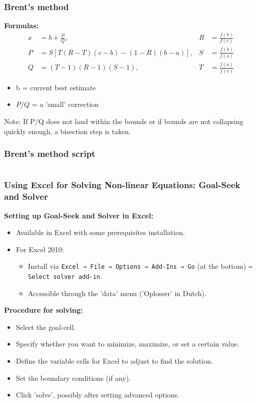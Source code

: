 \begin{frame}[fragile]
  \frametitle{Brent's method}
  \textbf{Formulas:}
  \begin{align*}
    x &= b + \frac{P}{Q}, & R &= \frac{f(b)}{f(c)} \\
    P &= S\left[T(R-T)(c-b) - (1-R)(b-a)\right], & S &= \frac{f(b)}{f(a)} \\
    Q &= (T-1)(R-1)(S-1), & T &= \frac{f(a)}{f(c)}
    \end{align*}
    \begin{itemize}
      \item b = current best estimate
      \item $P/Q$ = a 'small' correction
    \end{itemize}
    Note: If P/Q does not land within the bounds or if bounds are not collapsing quickly enough, a bisection step is taken.
\end{frame}

\begin{frame}[fragile]
  \frametitle{Brent's method script}
  \begin{columns}
  
  
  \end{columns}
\end{frame}



\begin{frame}[fragile]
    \frametitle{Using Excel for Solving Non-linear Equations: Goal-Seek and Solver}

    \textbf{Setting up Goal-Seek and Solver in Excel:}
    \begin{itemize}
        \item Available in Excel with some prerequisites installation.
        \item For Excel 2010:
        \begin{itemize}
            \item Install via \texttt{Excel → File → Options → Add-Ins → Go} (at the bottom) \texttt{→ Select solver add-in}.
            \item Accessible through the 'data' menu ('Oplosser' in Dutch).
        \end{itemize}
    \end{itemize}

    \textbf{Procedure for solving:}
    \begin{itemize}
        \item Select the goal-cell.
        \item Specify whether you want to minimize, maximize, or set a certain value.
        \item Define the variable cells for Excel to adjust to find the solution.
        \item Set the boundary conditions (if any).
        \item Click 'solve', possibly after setting advanced options.
    \end{itemize}
\end{frame}

